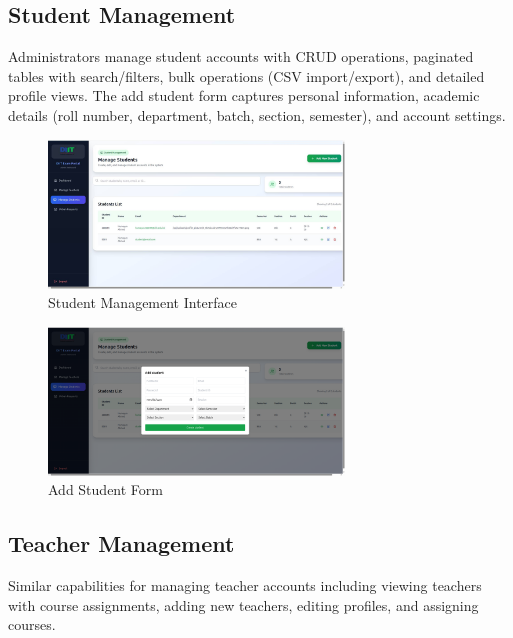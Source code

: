 \subsection{Student Management}

Administrators manage student accounts with CRUD operations, paginated tables with search/filters, bulk operations (CSV import/export), and detailed profile views. The add student form captures personal information, academic details (roll number, department, batch, section, semester), and account settings.

\begin{figure}[p]
    \centering
    \includegraphics[width=0.7\textwidth]{Chap4/admin_student_management.jpg}
    \caption{Student Management Interface}
    \label{fig:admin_students}
\end{figure}

\begin{figure}[p]
    \centering
    \includegraphics[width=0.7\textwidth]{Chap4/admin_add_student.png}
    \caption{Add Student Form}
    \label{fig:admin_add_student}
\end{figure}

\subsection{Teacher Management}

Similar capabilities for managing teacher accounts including viewing teachers with course assignments, adding new teachers, editing profiles, and assigning courses.

